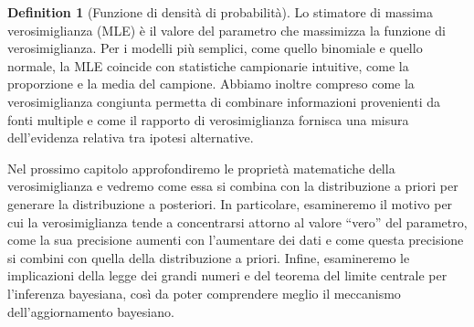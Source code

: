 \documentclass[
  letterpaper,
  DIV=11,
  numbers=noendperiod,
  oneside]{scrreprt}
\theoremstyle{definition}
\theoremstyle{plain}
\theoremstyle{definition}
\newtheorem{definition}{Definition}[chapter]
\theoremstyle{remark}
\begin{document}
\begin{definition}[Funzione di densità di
probabilità]
Lo stimatore di massima verosimiglianza (MLE) è il valore del parametro
che massimizza la funzione di verosimiglianza. Per i modelli più
semplici, come quello binomiale e quello normale, la MLE coincide con
statistiche campionarie intuitive, come la proporzione e la media del
campione. Abbiamo inoltre compreso come la verosimiglianza congiunta
permetta di combinare informazioni provenienti da fonti multiple e come
il rapporto di verosimiglianza fornisca una misura dell'evidenza
relativa tra ipotesi alternative.

Nel prossimo capitolo approfondiremo le proprietà matematiche della
verosimiglianza e vedremo come essa si combina con la distribuzione a
priori per generare la distribuzione a posteriori. In particolare,
esamineremo il motivo per cui la verosimiglianza tende a concentrarsi
attorno al valore ``vero'' del parametro, come la sua precisione aumenti
con l'aumentare dei dati e come questa precisione si combini con quella
della distribuzione a priori. Infine, esamineremo le implicazioni della
legge dei grandi numeri e del teorema del limite centrale per
l'inferenza bayesiana, così da poter comprendere meglio il meccanismo
dell'aggiornamento bayesiano.

\begin{tcolorbox}[enhanced jigsaw, arc=.35mm, breakable, colbacktitle=quarto-callout-note-color!10!white, opacityback=0, toprule=.15mm, rightrule=.15mm, colback=white, opacitybacktitle=0.6, leftrule=.75mm, coltitle=black, bottomtitle=1mm, left=2mm, toptitle=1mm, title=\textcolor{quarto-callout-note-color}{\faInfo}\hspace{0.5em}{Informazioni sull'ambiente di sviluppo}, titlerule=0mm, bottomrule=.15mm, colframe=quarto-callout-note-color-frame]


\end{tcolorbox}
\end{definition}
\end{document}
